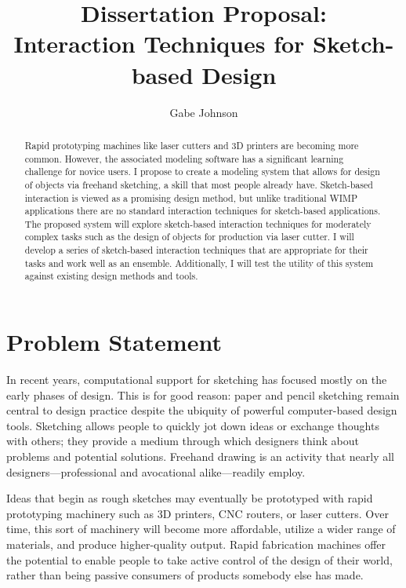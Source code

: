 \documentclass[12pt]{article}
\title{Dissertation Proposal:\\
Interaction Techniques for Sketch-based Design}
\author{Gabe Johnson}
\begin{document}
\maketitle

\doublespacing %

\begin{abstract}
Rapid prototyping machines like laser cutters and 3D printers are
becoming more common. However, the associated modeling software has a
significant learning challenge for novice users. I propose to create a
modeling system that allows for design of objects via freehand
sketching, a skill that most people already have. Sketch-based
interaction is viewed as a promising design method, but unlike
traditional WIMP applications there are no standard interaction
techniques for sketch-based applications. The proposed system will
explore sketch-based interaction techniques for moderately complex
tasks such as the design of objects for production via laser cutter. I
will develop a series of sketch-based interaction techniques that are
appropriate for their tasks and work well as an ensemble. 
Additionally, I will test the utility of this system against existing
design methods and tools.
\end{abstract}

\section{Problem Statement}

In recent years, computational support for sketching has focused
mostly on the early phases of design. This is for good reason: paper
and pencil sketching remain central to design practice despite the
ubiquity of powerful computer-based design tools. Sketching allows
people to quickly jot down ideas or exchange thoughts with others;
they provide a medium through which designers think about problems and
potential solutions. Freehand drawing is an activity that nearly all
designers---professional and avocational alike---readily employ.

Ideas that begin as rough sketches may eventually be prototyped with
rapid prototyping machinery such as 3D printers, CNC routers, or laser
cutters. Over time, this sort of machinery will become more
affordable, utilize a wider range of materials, and produce
higher-quality output. Rapid fabrication machines offer the potential
to enable people to take active control of the design of their world,
rather than being passive consumers of products somebody else has
made.
\end{document}
